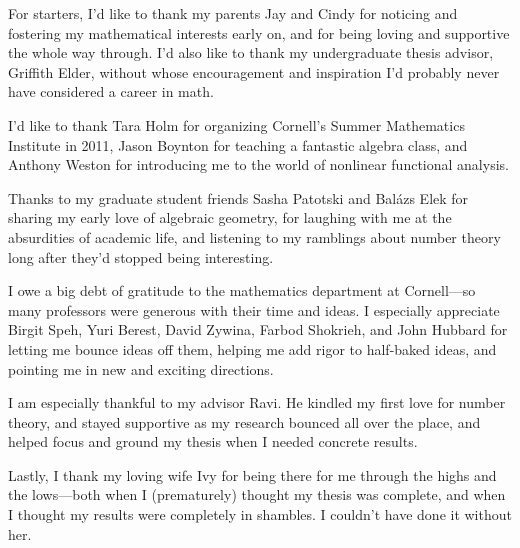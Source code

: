 \documentclass[phd,cornellheadings]{cornell}
\begin{document}
\begin{acknowledgements}
For starters, I'd like to thank my parents Jay and Cindy for noticing and 
fostering my mathematical interests early on, and for being loving and 
supportive the whole way through. I'd also like to thank my undergraduate 
thesis advisor, Griffith Elder, without whose encouragement and inspiration 
I'd probably never have considered a career in math. 

I'd like to thank Tara Holm for organizing Cornell's Summer Mathematics 
Institute in 2011, Jason Boynton for teaching a fantastic algebra class, and 
Anthony Weston for introducing me to the world of nonlinear functional 
analysis. 

Thanks to my graduate student friends Sasha Patotski and Bal\'azs Elek for 
sharing my early love of algebraic geometry, for laughing with me at the 
absurdities of academic life, and listening to my ramblings about number 
theory long after they'd stopped being interesting. 

I owe a big debt of gratitude to the mathematics department at Cornell---so 
many professors were generous with their time and ideas. I especially 
appreciate Birgit Speh, Yuri Berest, David Zywina, Farbod Shokrieh, and John 
Hubbard for letting me bounce ideas off them, helping me add rigor to 
half-baked ideas, and pointing me in new and exciting directions. 

I am especially thankful to my advisor Ravi. He kindled my first love for 
number theory, and stayed supportive as my research bounced all over the place, 
and helped focus and ground my thesis when I needed concrete results. 

Lastly, I thank my loving wife Ivy for being there for me through the highs and 
the lows---both when I (prematurely) thought my thesis was complete, and when I 
thought my results were completely in shambles. I couldn't have done it 
without her. 
\end{acknowledgements}

\contentspage

\normalspacing
\setcounter{page}{1}
\pagestyle{cornell}




















\printbibliography[heading=bibintoc]
\end{document}
